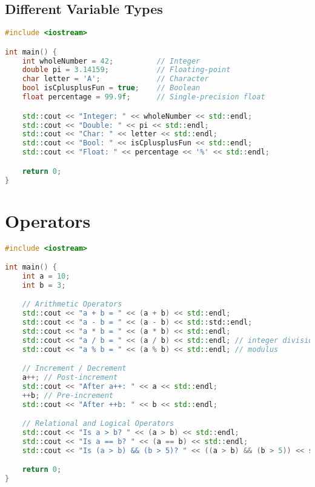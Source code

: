 \documentclass[a4paper,12pt]{article}
\begin{document}
\subsection{Different Variable Types}

\begin{lstlisting}[language=C++, caption={Example of different variable types}]
#include <iostream>

int main() {
    int wholeNumber = 42;          // Integer
    double pi = 3.14159;           // Floating-point
    char letter = 'A';             // Character
    bool isCplusplusFun = true;    // Boolean
    float percentage = 99.9f;      // Single-precision float

    std::cout << "Integer: " << wholeNumber << std::endl;
    std::cout << "Double: " << pi << std::endl;
    std::cout << "Char: " << letter << std::endl;
    std::cout << "Bool: " << isCplusplusFun << std::endl;
    std::cout << "Float: " << percentage << '%' << std::endl;

    return 0;
}
\end{lstlisting}

\section{Operators}

\begin{lstlisting}[language=C++, caption={Example showcasing basic operators}]
#include <iostream>

int main() {
    int a = 10;
    int b = 3;

    // Arithmetic Operators
    std::cout << "a + b = " << (a + b) << std::endl;
    std::cout << "a - b = " << (a - b) << std::std::endl;
    std::cout << "a * b = " << (a * b) << std::endl;
    std::cout << "a / b = " << (a / b) << std::endl; // integer division
    std::cout << "a % b = " << (a % b) << std::endl; // modulus

    // Increment / Decrement
    a++; // Post-increment
    std::cout << "After a++: " << a << std::endl;
    ++b; // Pre-increment
    std::cout << "After ++b: " << b << std::endl;

    // Relational and Logical Operators
    std::cout << "Is a > b? " << (a > b) << std::endl;
    std::cout << "Is a == b? " << (a == b) << std::endl;
    std::cout << "Is (a > b) && (b > 5)? " << ((a > b) && (b > 5)) << std::endl;

    return 0;
}
\end{lstlisting}
\end{document}
